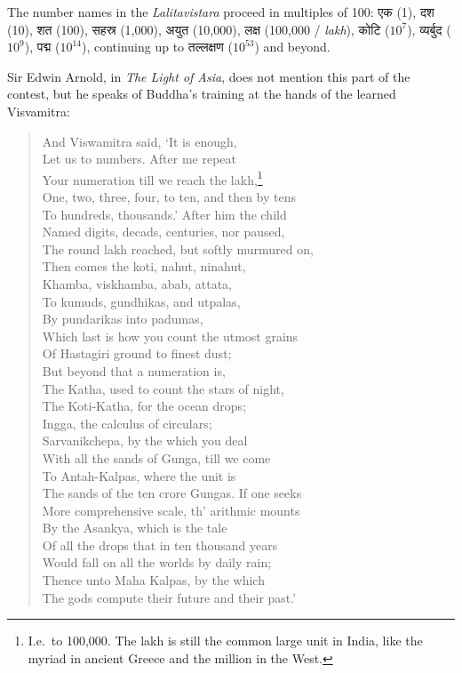 \documentclass[11pt,a4paper]{article}
\newcommand{\dev}[1]{{\devanagarifont #1}}
\newenvironment{enhancednote}{%
  \begin{tcolorbox}[colback=enhancedbg,colframe=notecolor,boxrule=1pt,
    left=10pt,right=10pt,top=8pt,bottom=8pt,
    title={\textbf{Enhanced Edition Note}},fonttitle=\bfseries\color{notecolor}]
}{\end{tcolorbox}}
\begin{document}
\begin{enhancednote}
The number names in the \textit{Lalitavistara} proceed in multiples of 100:
\dev{एक} (1), \dev{दश} (10), \dev{शत} (100), \dev{सहस्र} (1,000), \dev{अयुत} (10,000), \dev{लक्ष} (100,000 / \textit{lakh}), \dev{कोटि} ($10^7$), \dev{व्यर्बुद} ($10^9$), \dev{पद्म} ($10^{14}$), continuing up to \dev{तल्लक्षण} ($10^{53}$) and beyond.
\end{enhancednote}

Sir Edwin Arnold, in \textit{The Light of Asia}, does not mention this part of the contest, but he speaks of Buddha's training at the hands of the learned Visvamitra:

\begin{verse}
And Viswamitra said, `It is enough,\\
Let us to numbers. After me repeat\\
Your numeration till we reach the lakh,\footnote{I.e.\ to 100,000. The lakh is still the common large unit in India, like the myriad in ancient Greece and the million in the West.}\\
One, two, three, four, to ten, and then by tens\\
To hundreds, thousands.' After him the child\\
Named digits, decads, centuries, nor paused,\\
The round lakh reached, but softly murmured on,\\
Then comes the koti, nahut, ninahut,\\
Khamba, viskhamba, abab, attata,\\
To kumuds, gundhikas, and utpalas,\\
By pundarikas into padumas,\\
Which last is how you count the utmost grains\\
Of Hastagiri ground to finest dust;\\
But beyond that a numeration is,\\
The Katha, used to count the stars of night,\\
The Koti-Katha, for the ocean drops;\\
Ingga, the calculus of circulars;\\
Sarvanikchepa, by the which you deal\\
With all the sands of Gunga, till we come\\
To Antah-Kalpas, where the unit is\\
The sands of the ten crore Gungas. If one seeks\\
More comprehensive scale, th' arithmic mounts\\
By the Asankya, which is the tale\\
Of all the drops that in ten thousand years\\
Would fall on all the worlds by daily rain;\\
Thence unto Maha Kalpas, by the which\\
The gods compute their future and their past.'
\end{verse}
\end{document}

